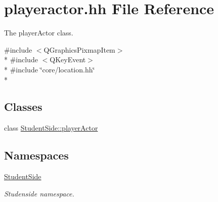 \hypertarget{playeractor_8hh}{\section{playeractor.\-hh File Reference}
\label{playeractor_8hh}
}


The player\-Actor class.  


{\ttfamily \#include $<$Q\-Graphics\-Pixmap\-Item$>$}\\*
{\ttfamily \#include $<$Q\-Key\-Event$>$}\\*
{\ttfamily \#include \char`\"{}core/location.\-hh\char`\"{}}\\*
\subsection*{Classes}
\begin{DoxyCompactItemize}
\item 
class \hyperlink{class_student_side_1_1player_actor}{Student\-Side\-::player\-Actor}
\end{DoxyCompactItemize}
\subsection*{Namespaces}
\begin{DoxyCompactItemize}
\item 
\hyperlink{namespace_student_side}{Student\-Side}
\begin{DoxyCompactList}\small\item\em Studenside namespace. \end{DoxyCompactList}\end{DoxyCompactItemize}
